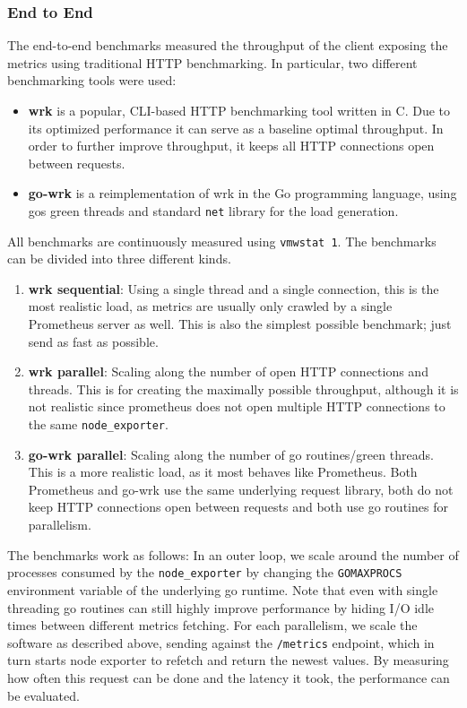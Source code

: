 \subsubsection{End to End}
The end-to-end benchmarks measured the throughput of the client exposing the metrics using traditional HTTP benchmarking. In particular, two different
benchmarking tools were used:
\begin{itemize}
  \item \textbf{wrk} \cite{wrk} is a popular, CLI-based HTTP benchmarking tool written in C. Due to its optimized
    performance it can serve as a baseline optimal throughput. In order to further improve throughput, it keeps
    all HTTP connections open between requests.
  \item \textbf{go-wrk} \cite{go-wrk} is a reimplementation of wrk in the Go programming language, using gos
    green threads and standard \texttt{net} library for the load generation.
\end{itemize}
All benchmarks are continuously measured using \texttt{vmwstat 1}. The benchmarks can be divided into three different kinds.
\begin{enumerate}
  \item \textbf{wrk sequential}: Using a single thread and a single connection, this is the most realistic load,
    as metrics are usually only crawled by a single Prometheus server as well. This is also the simplest possible benchmark;
    just send as fast as possible.
  \item \textbf{wrk parallel}: Scaling along the number of open HTTP connections and threads. This is for creating the maximally possible throughput, although it is not realistic since prometheus does not open multiple HTTP connections to the same \texttt{node\_exporter}.
  \item \textbf{go-wrk parallel}: Scaling along the number of go routines/green threads. This is a more realistic load, as it most behaves like Prometheus. Both Prometheus and go-wrk use the same underlying request library, both do not keep HTTP connections open between requests and both use go routines for parallelism.
\end{enumerate}
The benchmarks work as follows: In an outer loop, we scale around the number of processes consumed by the \texttt{node\_exporter} by changing the \texttt{GOMAXPROCS} environment variable of the underlying go runtime. Note that even with single threading go routines can still highly improve performance by hiding I/O idle times between different metrics fetching. For each parallelism, we scale the software as described above, sending against the \texttt{/metrics} endpoint, which in turn starts node exporter to refetch and return the newest values. By measuring how often this request can be done and the latency it took, the performance can be evaluated.

